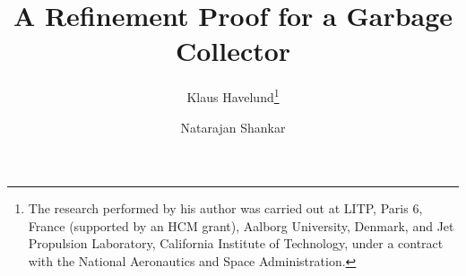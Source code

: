 \documentclass{llncs}
\begin{document}
\title{A Refinement Proof for a Garbage Collector}

\author{ 
Klaus Havelund\thanks{The research 
performed by his author was carried out at
LITP, Paris 6, France (supported by an HCM grant), 
Aalborg University, Denmark,
and Jet Propulsion Laboratory, California 
Institute of Technology, under a contract with the National Aeronautics 
and Space Administration.}
\and
Natarajan Shankar
}






\maketitle














\appendix
{}


\end{document}
